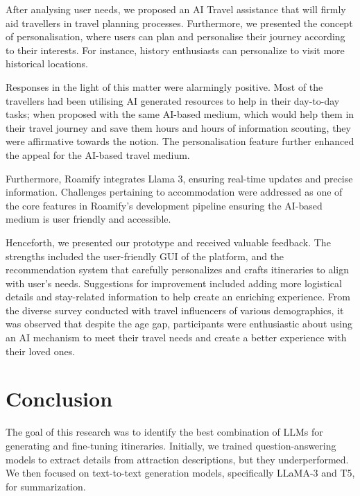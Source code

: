 \documentclass[final,3p,times,authoryear]{elsarticle}
\begin{document}
   After analysing user needs, we proposed an AI Travel assistance that will firmly aid travellers in travel planning processes. Furthermore, we presented the concept of personalisation, where users can plan and personalise their journey according to their interests. For instance, history enthusiasts can personalize to visit more historical locations.
    
    Responses in the light of this matter were alarmingly positive. Most of the travellers had been utilising AI generated resources to help in their day-to-day tasks; when proposed with the same AI-based medium, which would help them in their travel journey and save them hours and hours of information scouting, they were affirmative towards the notion. The personalisation feature further enhanced the appeal for the AI-based travel medium.
    
    Furthermore, Roamify integrates Llama 3, ensuring real-time updates and precise information. Challenges pertaining to accommodation were addressed as one of the core features in Roamify's development pipeline ensuring the AI-based medium is user friendly and accessible.
    
    Henceforth, we presented our prototype and received valuable feedback. The strengths included the user-friendly GUI of the platform, and the recommendation system that carefully personalizes and crafts itineraries to align with user's needs. Suggestions for improvement included adding more logistical details and stay-related information to help create an enriching experience. From the diverse survey conducted with travel influencers of various demographics, it was observed that despite the age gap, participants were enthusiastic about using an AI mechanism to meet their travel needs and create a better experience with their loved ones.

\vspace{-7pt}

\section{Conclusion}
    
    The goal of this research was to identify the best combination of LLMs for generating and fine-tuning itineraries. Initially, we trained question-answering models to extract details from attraction descriptions, but they underperformed. We then focused on text-to-text generation models, specifically LLaMA-3 and T5, for summarization.
    
\end{document}
